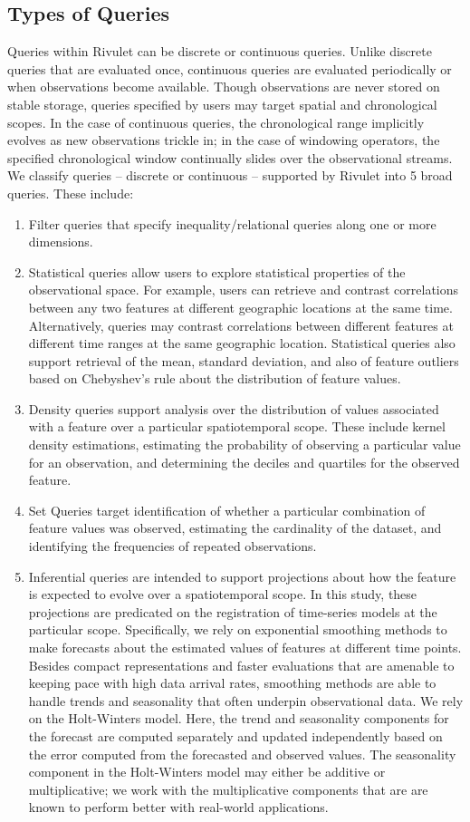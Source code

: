 \subsection{Types of Queries}
Queries within Rivulet can be discrete or continuous queries. Unlike discrete queries that are evaluated once, continuous queries are evaluated periodically or when observations become available. Though observations are never stored on stable storage, queries specified by users may target spatial and chronological scopes. In the case of continuous queries, the chronological range implicitly evolves as new observations trickle in; in the case of windowing operators, the specified chronological window continually slides over the observational streams. We classify queries – discrete or continuous –   supported by Rivulet into 5 broad queries. These include:
\begin{enumerate} 
	\item	Filter queries that specify inequality/relational queries along one or more dimensions. 
	\item	Statistical queries allow users to explore statistical properties of the observational space. For example, users can retrieve and contrast correlations between any two features at different geographic locations at the same time. Alternatively, queries may contrast correlations between different features at different time ranges at the same geographic location. Statistical queries also support retrieval of the mean, standard deviation, and also of feature outliers based on Chebyshev’s rule about the distribution of feature values.
	\item	Density queries support analysis over the distribution of values associated with a feature over a particular spatiotemporal scope. These include kernel density estimations, estimating the probability of observing a particular value for an observation, and determining the deciles and quartiles for the observed feature. 
	\item	Set Queries target identification of whether a particular combination of feature values was observed, estimating the cardinality of the dataset, and identifying the frequencies of repeated observations.
	\item	Inferential queries are intended to support projections about how the feature is expected to evolve over a spatiotemporal scope. In this study, these projections are predicated on the registration of time-series models at the particular scope. Specifically, we rely on exponential smoothing methods to make forecasts about the estimated values of features at different time points. Besides compact representations and faster evaluations that are amenable to keeping pace with high data arrival rates, smoothing methods are able to handle trends and seasonality that often underpin observational data. We rely on the Holt-Winters model. Here, the trend and seasonality components for the forecast are computed separately and updated independently based on the error computed from the forecasted and observed values. The seasonality component in the Holt-Winters model may either be additive or multiplicative; we work with the multiplicative components that are are known to perform better with real-world applications. 

\end{enumerate}
